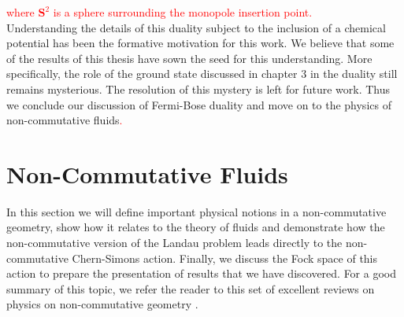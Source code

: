     \textcolor{red}{where $\mathbf{S}^2$ is a sphere surrounding the monopole insertion point.} \\
            \indent Understanding the details of this duality subject to the inclusion of a chemical potential has been the formative motivation for this work. We believe that some of the results of this thesis have sown the seed for this understanding. More specifically, the role of the ground state discussed in chapter 3 in the duality still remains mysterious. The resolution of this mystery is left for future work. Thus we conclude our discussion of Fermi-Bose duality and move on to the physics of non-commutative fluids\textcolor{red}{.}
%
        \section{Non-Commutative Fluids}
    In this section we will define important physical notions in a non-commutative geometry, show how it relates to the theory of fluids and demonstrate how the non-commutative version of the Landau problem leads directly to the non-commutative Chern-Simons action. Finally, we discuss the Fock space of this action to prepare the presentation of results that we have discovered. For a good summary of this topic, we refer the reader to this set of excellent reviews on physics on non-commutative geometry \cite{Polychronakos:2007df, Szabo:2001kg, Douglas:2001ba}.

